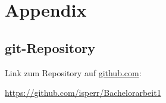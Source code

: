 \appendix


\section*{Appendix}
\renewcommand{\thesubsection}{\Alph{subsection}}

\subsection{git-Repository}



Link zum Repository auf {\url{github.com}}:

{\url{https://github.com/isperr/Bachelorarbeit1}}


